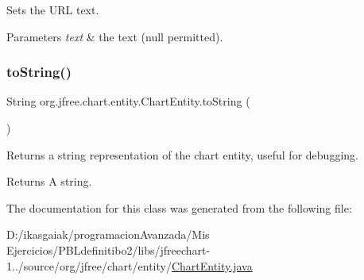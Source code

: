 Sets the U\+RL text.


\begin{DoxyParams}{Parameters}
{\em text} & the text ({\ttfamily null} permitted). \\
\hline
\end{DoxyParams}
\mbox{\label{classorg_1_1jfree_1_1chart_1_1entity_1_1_chart_entity_a9e3f3665275502c0424bead57fb38096}} 
\subsubsection{\texorpdfstring{to\+String()}{toString()}}
{\footnotesize\ttfamily String org.\+jfree.\+chart.\+entity.\+Chart\+Entity.\+to\+String (\begin{DoxyParamCaption}{ }\end{DoxyParamCaption})}

Returns a string representation of the chart entity, useful for debugging.

\begin{DoxyReturn}{Returns}
A string. 
\end{DoxyReturn}


The documentation for this class was generated from the following file\+:\begin{DoxyCompactItemize}
\item 
D\+:/ikasgaiak/programacion\+Avanzada/\+Mis Ejercicios/\+P\+B\+Ldefinitibo2/libs/jfreechart-\/1../source/org/jfree/chart/entity/\mbox{\hyperlink{_chart_entity_8java}{Chart\+Entity.\+java}}\end{DoxyCompactItemize}
